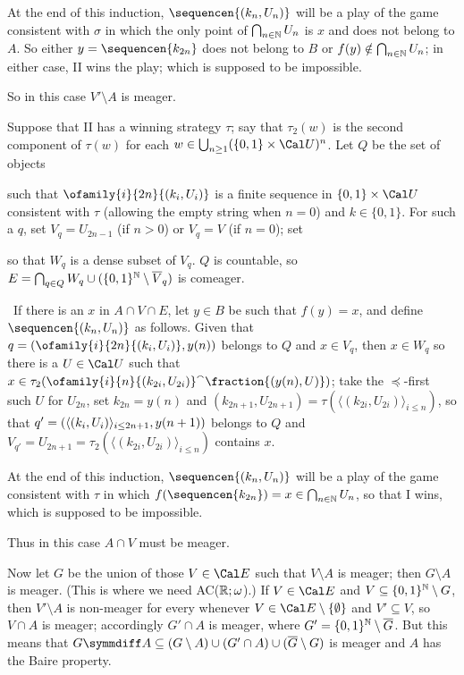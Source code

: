 {At the end of this induction, $\sequencen{(k_n,U_n)}$ will be a play of the
game consistent with $\sigma$ in which the only point of
$\bigcap_{n\in\Bbb N}U_n$ is $x$ and does not belong to $A$.
So either $y=\sequencen{k_{2n}}$ does not belong to $B$ or
$f(y)\notin\bigcap_{n\in\Bbb N}U_n$;  in either case, II wins the play;
which is supposed to be impossible.\ \Bang

So in this case $V'\setminus A$ is meager.

\medskip

 Suppose that II has a winning strategy $\tau$;
say that $\tau_2(w)$ is the second component of $\tau(w)$ for each
$w\in\bigcup_{n\ge 1}(\{0,1\}\times\Cal U)^n$.
Let $Q$ be the set of objects


\noindent such that $\ofamily{i}{2n}{(k_i,U_i)}$ is a finite sequence in
$\{0,1\}\times\Cal U$ consistent with $\tau$ (allowing the empty string
when $n=0$) and $k\in\{0,1\}$.   For such a $q$, set $V_q=U_{2n-1}$ (if
$n>0$) or $V_q=V$ (if $n=0$);  set


\noindent so that $W_q$ is a dense subset of $V_q$.   $Q$ is countable, so
$E=\bigcap_{q\in Q}W_q\cup(\{0,1\}^{\Bbb N}\setminus\overline{V}_q)$ is
comeager.

\Quer\ If there is an $x$ in $A\cap V\cap E$, let
$y\in B$ be such that $f(y)=x$, and define
$\sequencen{(k_n,U_n)}$ as follows.   Given that
$q=(\ofamily{i}{2n}{(k_i,U_i)},y(n))$ belongs to $Q$ and $x\in V_q$,
then $x\in W_q$ so there is a $U\in\Cal U$ such that
$x\in\tau_2({\ofamily{i}{n}{(k_{2i},U_{2i})}}^{\smallfrown}
  \penalty-100\fraction{(y(n),U)})$;
take the
$\preccurlyeq$-first such $U$ for $U_{2n}$, set $k_{2n}=y(n)$ and
$(k_{2n+1},U_{2n+1})=\tau(\langle(k_{2i},U_{2i})\rangle_{i\le n})$,
so that $q'=(\langle(k_i,U_i)\rangle_{i\le 2n+1},\penalty-100y(n+1))$
belongs to $Q$ and
$V_{q'}=U_{2n+1}=\tau_2(\langle(k_{2i},U_{2i})\rangle_{i\le n})$
contains $x$.

At the end of this induction, $\sequencen{(k_n,U_n)}$ will be a play of the
game consistent with $\tau$ in which
$f(\sequencen{k_{2n}})=x\in\bigcap_{n\in\Bbb N}U_n$, so that I wins, which
is supposed to be impossible.\ \Bang

Thus in this case $A\cap V$ must be meager.\ \Qed

\medskip

 Now let $G$ be the union of those $V\in\Cal E$
such that $V\setminus A$ is meager;  then
$G\setminus A$ is meager.   (This is where we need AC($\Bbb R;\omega$).)
If $V\in\Cal E$ and $V\subseteq\{0,1\}^{\Bbb N}\setminus G$,
then $V'\setminus A$ is non-meager for every whenever
$V\in\Cal E\setminus\{\emptyset\}$ and $V'\subseteq V$,
so $V\cap A$ is meager;  accordingly $G'\cap A$ is meager, where
$G'=\{0,1\}^{\Bbb N}\setminus\overline{G}$.   But this means that
$G\symmdiff A
\subseteq(G\setminus A)\cup(G'\cap A)\cup(\overline{G}\setminus G)$ is
meager and $A$ has the Baire property.
}%

